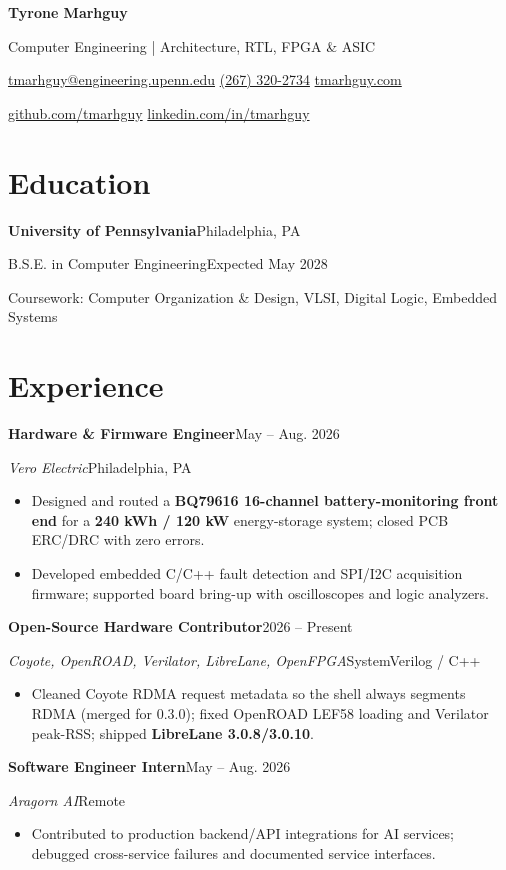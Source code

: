 \documentclass[10pt,letterpaper]{article}
\newcommand{\role}[4]{\par\addvspace{4pt}%
  \textbf{#1}\hfill {\small #2}\par
  \textit{#3}\hfill {\small #4}\par}
\begin{document}
\fontsize{10.7}{12.6}\selectfont
\begin{center}
{\fontsize{23}{25}\selectfont\bfseries Tyrone Marhguy}\par
\vspace{3pt}
Computer Engineering | Architecture, RTL, FPGA \& ASIC\par
\vspace{3pt}
{\small \href{mailto:tmarhguy@engineering.upenn.edu}{tmarhguy@engineering.upenn.edu}
\enspace\textbar\enspace \href{tel:+12673202734}{(267) 320-2734}
\enspace\textbar\enspace \href{https://tmarhguy.com}{tmarhguy.com}\par
\href{https://github.com/tmarhguy}{github.com/tmarhguy}
\enspace\textbar\enspace \href{https://linkedin.com/in/tmarhguy}{linkedin.com/in/tmarhguy}}
\end{center}
\section{Education}
\textbf{University of Pennsylvania}\hfill Philadelphia, PA\par
B.S.E. in Computer Engineering\hfill Expected May 2028\par
{\small Coursework: Computer Organization \& Design, VLSI, Digital Logic, Embedded Systems}\par

\section{Experience}
\role{Hardware \& Firmware Engineer}{May -- Aug. 2026}{Vero Electric}{Philadelphia, PA}
\begin{itemize}
\item Designed and routed a \textbf{BQ79616 16-channel battery-monitoring front end} for a \textbf{240 kWh / 120 kW} energy-storage system; closed PCB ERC/DRC with zero errors.
\item Developed embedded C/C++ fault detection and SPI/I2C acquisition firmware; supported board bring-up with oscilloscopes and logic analyzers.
\end{itemize}
\role{Open-Source Hardware Contributor}{2026 -- Present}{Coyote, OpenROAD, Verilator, LibreLane, OpenFPGA}{SystemVerilog / C++}
\begin{itemize}
\item Cleaned Coyote RDMA request metadata so the shell always segments RDMA (merged for 0.3.0); fixed OpenROAD LEF58 loading and Verilator peak-RSS; shipped \textbf{LibreLane 3.0.8/3.0.10}.
\end{itemize}
\role{Software Engineer Intern}{May -- Aug. 2026}{Aragorn AI}{Remote}
\begin{itemize}
\item Contributed to production backend/API integrations for AI services; debugged cross-service failures and documented service interfaces.
\end{itemize}
\end{document}
